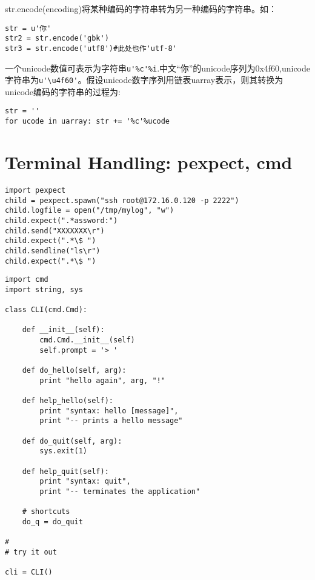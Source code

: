 str.encode(encoding)将某种编码的字符串转为另一种编码的字符串。如：
\begin{verbatim}
str = u'你'
str2 = str.encode('gbk')
str3 = str.encode('utf8')#此处也作'utf-8'
\end{verbatim}


一个unicode数值可表示为字符串\verb|u'%c'%i|.中文“你”的unicode序列为0x4f60,unicode字符串为\verb|u'\u4f60'|。假设unicode数字序列用链表uarray表示，则其转换为unicode编码的字符串的过程为:
\begin{verbatim}
str = ''
for ucode in uarray: str += '%c'%ucode
\end{verbatim}

\label{subsec:PythonUnicode}

\section{Terminal Handling: pexpect, cmd}

\begin{lstlisting}
import pexpect
child = pexpect.spawn("ssh root@172.16.0.120 -p 2222")
child.logfile = open("/tmp/mylog", "w")
child.expect(".*assword:")
child.send("XXXXXXX\r")
child.expect(".*\$ ")
child.sendline("ls\r")
child.expect(".*\$ ")
\end{lstlisting}


\begin{lstlisting}
import cmd
import string, sys

class CLI(cmd.Cmd):

    def __init__(self):
        cmd.Cmd.__init__(self)
        self.prompt = '> '

    def do_hello(self, arg):
        print "hello again", arg, "!"

    def help_hello(self):
        print "syntax: hello [message]",
        print "-- prints a hello message"

    def do_quit(self, arg):
        sys.exit(1)

    def help_quit(self):
        print "syntax: quit",
        print "-- terminates the application"

    # shortcuts
    do_q = do_quit

#
# try it out

cli = CLI()
\end{lstlisting}

























